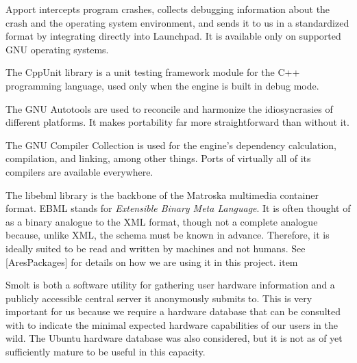 

\startitemize[4]

Apport intercepts program crashes, collects debugging information about the crash and the operating system environment, and sends it to us in a standardized format by integrating directly into Launchpad. It is available only on supported GNU operating systems.


The CppUnit library is a unit testing framework module for the C++ programming language, used only when the engine is built in debug mode.


The GNU Autotools are used to reconcile and harmonize the idiosyncrasies of different platforms. It makes portability far more straightforward than without it.


The GNU Compiler Collection is used for the engine's dependency calculation, compilation, and linking, among other things. Ports of virtually all of its compilers are available everywhere.


The libebml library is the backbone of the Matroska multimedia container format. EBML stands for {\it Extensible Binary Meta Language}. It is often thought of as a binary analogue to the XML format, though not a complete analogue because, unlike XML, the schema must be known in advance. Therefore, it is ideally suited to be read and written by machines and not humans. See [AresPackages] for details on how we are using it in this project.
item


Smolt is both a software utility for gathering user hardware information and a publicly accessible central server it anonymously submits to. This is very important for us because we require a hardware database that can be consulted with to indicate the minimal expected hardware capabilities of our users in the wild. The Ubuntu hardware database was also considered, but it is not as of yet sufficiently mature to be useful in this capacity.

